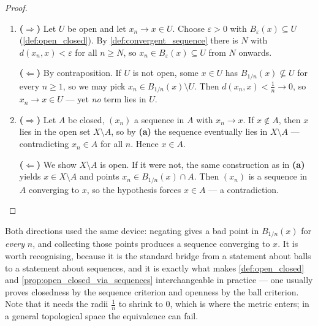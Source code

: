 \begin{proof}
\begin{enumerate}[label=\textbf{(\alph*)}]
  \item \textbf{($\Rightarrow$)} Let $U$ be open and let $x_n \to x \in U$. Choose
    $\varepsilon>0$ with $B_\varepsilon(x) \subseteq U$ (\cref{def:open_closed}). By
    \cref{def:convergent_sequence} there is $N$ with $d(x_n,x)<\varepsilon$ for all $n \geq N$,
    so $x_n \in B_\varepsilon(x) \subseteq U$ from $N$ onwards.

    \textbf{($\Leftarrow$)} By contraposition. If $U$ is not open, some $x \in U$ has
    $B_{1/n}(x) \not\subseteq U$ for every $n \geq 1$, so we may pick
    $x_n \in B_{1/n}(x)\setminus U$. Then $d(x_n,x) < \tfrac1n \to 0$, so $x_n \to x \in U$ ---
    yet \emph{no} term lies in $U$.
  \item \textbf{($\Rightarrow$)} Let $A$ be closed, $(x_n)$ a sequence in $A$ with $x_n \to x$.
    If $x \notin A$, then $x$ lies in the open set $X\setminus A$, so by \textbf{(a)} the
    sequence eventually lies in $X\setminus A$ --- contradicting $x_n \in A$ for all $n$. Hence
    $x \in A$.

    \textbf{($\Leftarrow$)} We show $X\setminus A$ is open. If it were not, the same
    construction as in \textbf{(a)} yields $x \in X\setminus A$ and points
    $x_n \in B_{1/n}(x) \cap A$. Then $(x_n)$ is a sequence in $A$ converging to $x$, so the
    hypothesis forces $x \in A$ --- a contradiction.
\end{enumerate}
\end{proof}

\begin{remark}
\label{rem:shrinking_ball_trick}
Both \qt{$\Leftarrow$} directions used the same device: negating 
gives a bad point in $B_{1/n}(x)$ for \emph{every} $n$, and collecting those points produces a
sequence converging to $x$. It is worth recognising, because it is the standard bridge from a
statement about balls to a statement about sequences, and it is exactly what makes
\cref{def:open_closed} and \cref{prop:open_closed_via_sequences} interchangeable in practice ---
one usually proves closedness by the sequence criterion and openness by the ball criterion.
Note that it needs the radii $\tfrac1n$ to shrink to $0$, which is where the metric enters;
in a general topological space the equivalence can fail.
\end{remark}

